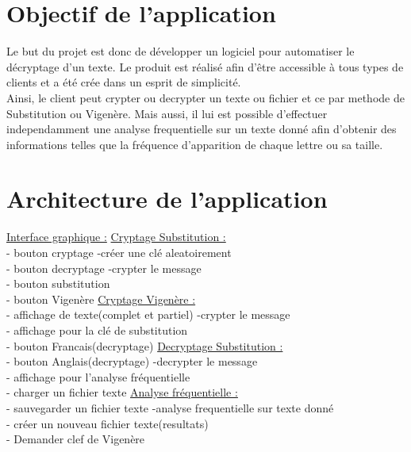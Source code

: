 \documentclass[a4]{article}
\begin{document}
	\section{Objectif de l'application}
	
	
	Le but du projet est donc de développer un logiciel pour automatiser le décryptage d'un texte.
  Le produit est réalisé afin d'être accessible à tous types de clients et a été crée dans un esprit de simplicité.\\
  Ainsi, le client peut crypter ou decrypter un texte ou fichier et ce par methode de Substitution ou Vigenère.
  Mais aussi, il lui est possible d'effectuer independamment une analyse frequentielle sur un texte donné afin d'obtenir
des informations telles que la fréquence d'apparition de chaque lettre ou sa taille.
	
	

	\section{Architecture de l'application}
			\underline{Interface graphique :}     \hspace{5cm}  \underline{Cryptage Substitution :}\\
			- bouton cryptage            \hspace{5.5cm}       -créer une clé aleatoirement\\
			- bouton decryptage         \hspace{5cm}        -crypter le message\\
			- bouton substitution\\
			- bouton Vigenère           \hspace{5.2cm}       \underline{Cryptage Vigenère :}\\
			- affichage de texte(complet et partiel)  \hspace{2.2cm} -crypter le message\\
			- affichage pour la clé de substitution\\
			- bouton Francais(decryptage)   \hspace{3.5cm}     \underline{Decryptage Substitution :}\\
			- bouton Anglais(decryptage)    \hspace{3.5cm}     -decrypter le message\\
			- affichage pour l'analyse fréquentielle\\
			- charger un fichier texte       \hspace{4.2cm}  \underline{Analyse fréquentielle :}\\
			- sauvegarder un fichier texte     \hspace{3.8cm}  -analyse frequentielle sur texte donné\\
			- créer un nouveau fichier texte(resultats)\\
			- Demander clef de Vigenère\\
			
\end{document}
